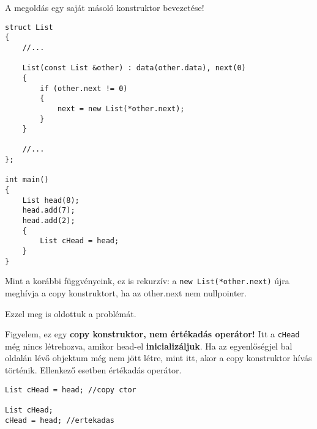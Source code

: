 \documentclass[a4paper,11.5pt,table]{article}
\begin{document}
	A megoldás egy saját másoló konstruktor bevezetése!
	
	
\begin{lstlisting}
struct List
{
	//...
	
	List(const List &other) : data(other.data), next(0)
	{
		if (other.next != 0)
		{
			next = new List(*other.next);
		}
	}
	
	//...
};

int main()
{
	List head(8);
	head.add(7);
	head.add(2);
	{
		List cHead = head;
	}
}
\end{lstlisting}
	Mint a korábbi függvényeink, ez is rekurzív: a \texttt{new List(*other.next)} újra meghívja a copy konstruktort, ha az other.next nem nullpointer.
	\begin{figure}[!h]
		\centering
	\end{figure}
	
	\medskip
	Ezzel meg is oldottuk a problémát. 
	
	Figyelem, ez egy \textbf{copy konstruktor, nem értékadás operátor!} Itt a \texttt{cHead} még nincs létrehozva, amikor head-el \textbf{inicializáljuk}. Ha az egyenlőségjel bal oldalán lévő objektum még nem jött létre, mint itt, akor a copy konstruktor hívás történik. Ellenkező esetben értékadás operátor.
	\begin{lstlisting}
List cHead = head; //copy ctor

List cHead;
cHead = head; //ertekadas
	\end{lstlisting}
	
\end{document}
